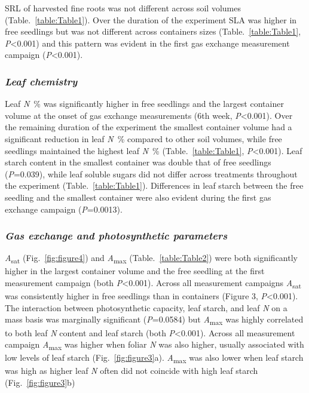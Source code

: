 \documentclass[a4paper]{article}\usepackage[]{graphicx}\usepackage[]{color}
\begin{document}
SRL of harvested fine roots was not different across soil volumes (Table.~\ref{table:Table1}). Over the duration of the experiment SLA was higher in free seedlings but was not different across containers sizes (Table.~\ref{table:Table1}, \textit{P}\textless0.001) and this pattern was evident in the first gas exchange measurement campaign (\textit{P}\textless0.001).

\subsubsection*{\textit{Leaf chemistry}}

Leaf \textit{N}~\% was significantly higher in free seedlings and the largest container volume at the onset of gas exchange measurements (6th week, \textit{P}\textless0.001).  Over the remaining duration of the experiment the smallest container volume had a significant reduction in leaf \textit{N}~\% compared to other soil volumes, while free seedlings maintained the highest leaf \textit{N}~\% (Table.~\ref{table:Table1}, \textit{P}\textless0.001).  Leaf starch content in the smallest container was double that of free seedlings (\textit{P}=0.039), while leaf soluble sugars did not differ across treatments throughout the experiment (Table.~\ref{table:Table1}).  Differences in leaf starch between the free seedling and the smallest container were also evident during the first gas exchange campaign (\textit{P}=0.0013). 

\subsubsection*{\textit{Gas exchange and photosynthetic parameters}}

\textit{A}\textsubscript{sat} (Fig.~\ref{fig:figure4}) and \textit{A}\textsubscript{max} (Table.~\ref{table:Table2}) were both significantly higher in the largest container volume and the free seedling at the first measurement campaign (both \textit{P}\textless0.001). Across all measurement campaigns \textit{A}\textsubscript{sat} was consistently higher in free seedlings than in containers (Figure 3, \textit{P}\textless0.001). The interaction between photosynthetic capacity, leaf starch, and leaf \textit{N} on a mass basis was marginally significant (\textit{P}=0.0584) but \textit{A}\textsubscript{max} was highly correlated to both leaf \textit{N} content and leaf starch (both \textit{P}\textless0.001). Across all measurement campaign \textit{A}\textsubscript{max} was higher when foliar \textit{N} was also higher, usually associated with low levels of leaf starch (Fig.~\ref{fig:figure3}a). \textit{A}\textsubscript{max} was also lower when leaf starch was high as higher leaf \textit{N} often did not coincide with high leaf starch (Fig.~\ref{fig:figure3}b)
\end{document}
